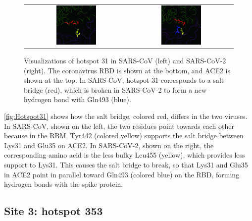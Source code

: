 \begin{figure}[h]
	\centering
	\mySfFamily
	\begin{tabular}{c c}
	\includegraphics[width = 0.4\textwidth]{../images_CMYK/Hotspot31_SARS} & \includegraphics[width = 0.4\textwidth]{../images_CMYK/Hotspot31_SARS-2}
	\end{tabular}
	\caption{Visualizations of hotspot 31 in SARS-CoV (left) and SARS-CoV-2 (right). The coronavirus RBD is shown at the bottom, and ACE2 is shown at the top. In SARS-CoV, hotspot 31 corresponds to a salt bridge (red), which is broken in SARS-CoV-2 to form a new hydrogen bond with Gln493 (blue).}
	\label{fig:Hotspot31}
\end{figure}

\autoref{fig:Hotspot31} shows how the salt bridge, colored red, differs in the two viruses. In SARS-CoV, shown on the left, the two residues point towards each other because in the RBM, Tyr442 (colored yellow) supports the salt bridge between Lys31 and Glu35 on ACE2. In SARS-CoV-2, shown on the right, the corresponding amino acid is the less bulky Leu455 (yellow), which provides less support to Lys31. This causes the salt bridge to break, so that Lys31 and Glu35 in ACE2 point in parallel toward Gln493 (colored blue) on the RBD, forming hydrogen bonds with the spike protein.

\FloatBarrier
{}
\subsection{Site 3: hotspot 353}

